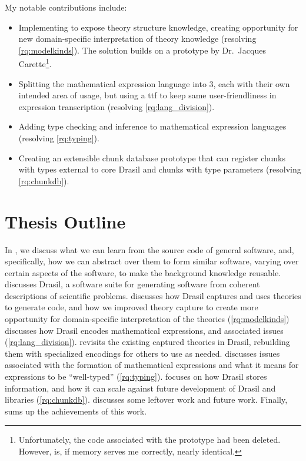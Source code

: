 My notable contributions include:

\begin{itemize}

      \item Implementing \ModelKinds{} to expose theory structure knowledge,
            creating opportunity for new domain-specific interpretation of
            theory knowledge (resolving \ref{rq:modelkinds}). The solution
            builds on a prototype by Dr.\ Jacques Carette\footnote{Unfortunately,
            the code associated with the prototype had been deleted. However,
             is, if memory serves me
            correctly, nearly identical.}.

      \item Splitting the mathematical expression language into 3, each with
            their own intended area of usage, but using a \acs{ttf}
            \cite{Carette2009} to keep same user-friendliness in expression
            transcription (resolving \ref{rq:lang_division}).

      \item Adding type checking and inference to mathematical expression
            languages (resolving \ref{rq:typing}).

      \item Creating an extensible chunk database prototype that can register
            chunks with types external to core Drasil and chunks with type
            parameters (resolving \ref{rq:chunkdb}).

\end{itemize}

\section{Thesis Outline}
\label{chap:intro:sec:thesis-outline}

In , we discuss what we can learn from the source code of
general software, and, specifically, how we can abstract over them to form
similar software, varying over certain aspects of the software, to make the
background knowledge reusable.  discusses Drasil, a software
suite for generating software from coherent descriptions of scientific problems.
 discusses how Drasil captures and uses theories to
generate code, and how we improved theory capture to create more opportunity for
domain-specific interpretation of the theories (\ref{rq:modelkinds})
 discusses how Drasil encodes mathematical expressions,
and associated issues (\ref{rq:lang_division}). 
revisits the existing captured theories in Drasil, rebuilding them with
specialized encodings for others to use as needed. 
discusses issues associated with the formation of mathematical expressions and
what it means for expressions to be ``well-typed'' (\ref{rq:typing}).
 focuses on how Drasil stores information, and how it
can scale against future development of Drasil and libraries (\ref{rq:chunkdb}).
 discusses some leftover work and future work. Finally,
 sums up the achievements of this work.
